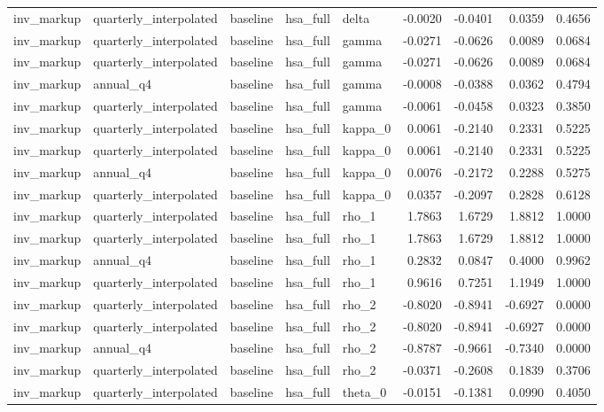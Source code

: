\begin{tabular}{lllllrrrr}
inv\_markup & quarterly\_interpolated & baseline & hsa\_full & delta & -0.0020 & -0.0401 & 0.0359 & 0.4656 \\
inv\_markup & quarterly\_interpolated & baseline & hsa\_full & gamma & -0.0271 & -0.0626 & 0.0089 & 0.0684 \\
inv\_markup & quarterly\_interpolated & baseline & hsa\_full & gamma & -0.0271 & -0.0626 & 0.0089 & 0.0684 \\
inv\_markup & annual\_q4 & baseline & hsa\_full & gamma & -0.0008 & -0.0388 & 0.0362 & 0.4794 \\
inv\_markup & quarterly\_interpolated & baseline & hsa\_full & gamma & -0.0061 & -0.0458 & 0.0323 & 0.3850 \\
inv\_markup & quarterly\_interpolated & baseline & hsa\_full & kappa\_0 & 0.0061 & -0.2140 & 0.2331 & 0.5225 \\
inv\_markup & quarterly\_interpolated & baseline & hsa\_full & kappa\_0 & 0.0061 & -0.2140 & 0.2331 & 0.5225 \\
inv\_markup & annual\_q4 & baseline & hsa\_full & kappa\_0 & 0.0076 & -0.2172 & 0.2288 & 0.5275 \\
inv\_markup & quarterly\_interpolated & baseline & hsa\_full & kappa\_0 & 0.0357 & -0.2097 & 0.2828 & 0.6128 \\
inv\_markup & quarterly\_interpolated & baseline & hsa\_full & rho\_1 & 1.7863 & 1.6729 & 1.8812 & 1.0000 \\
inv\_markup & quarterly\_interpolated & baseline & hsa\_full & rho\_1 & 1.7863 & 1.6729 & 1.8812 & 1.0000 \\
inv\_markup & annual\_q4 & baseline & hsa\_full & rho\_1 & 0.2832 & 0.0847 & 0.4000 & 0.9962 \\
inv\_markup & quarterly\_interpolated & baseline & hsa\_full & rho\_1 & 0.9616 & 0.7251 & 1.1949 & 1.0000 \\
inv\_markup & quarterly\_interpolated & baseline & hsa\_full & rho\_2 & -0.8020 & -0.8941 & -0.6927 & 0.0000 \\
inv\_markup & quarterly\_interpolated & baseline & hsa\_full & rho\_2 & -0.8020 & -0.8941 & -0.6927 & 0.0000 \\
inv\_markup & annual\_q4 & baseline & hsa\_full & rho\_2 & -0.8787 & -0.9661 & -0.7340 & 0.0000 \\
inv\_markup & quarterly\_interpolated & baseline & hsa\_full & rho\_2 & -0.0371 & -0.2608 & 0.1839 & 0.3706 \\
inv\_markup & quarterly\_interpolated & baseline & hsa\_full & theta\_0 & -0.0151 & -0.1381 & 0.0990 & 0.4050 \\

\end{tabular}
